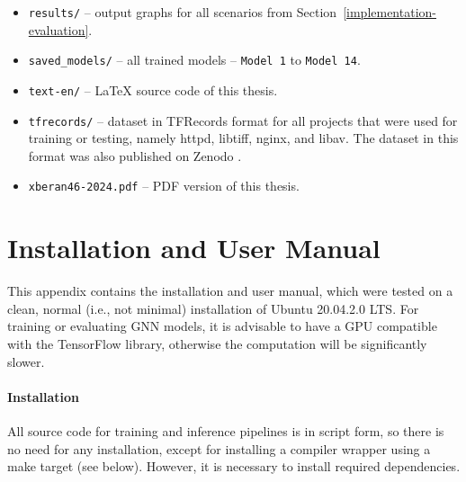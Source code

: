 \begin{itemize}
\begin{itemize}
\begin{itemize}
        \end{itemize}
        \item \texttt{sep-presentation-en/} -- \LaTeX\xspace source code of the SEP presentation.
        \item \texttt{sep-text-en/} -- \LaTeX\xspace source code of the SEP text.
        \item \texttt{text-en/} -- \LaTeX\xspace source code of this thesis.
        \item \texttt{text-template/} -- \LaTeX\xspace source code of the used template.
        \item \texttt{xberan46-2024.pdf} -- PDF version of this thesis.
        \item \texttt{.gitignore}
        \item \texttt{README.md}
    \end{itemize}

    \item \texttt{results/} -- output graphs for all scenarios from Section~\ref{implementation-evaluation}.
    \item \texttt{saved\_models/} -- all trained models -- \texttt{Model 1} to \texttt{Model 14}.
    \item \texttt{text-en/} -- \LaTeX\xspace source code of this thesis.
    \item \texttt{tfrecords/} -- dataset in TFRecords format for all projects that were used for training or testing, namely httpd, libtiff, nginx, and libav. The dataset in this format was also published on Zenodo \cite{zenodo-ecpg}.
    \item \texttt{xberan46-2024.pdf} -- PDF version of this thesis.
\end{itemize}



\chapter{Installation and User Manual}
\label{appendix-use-manual}
This appendix contains the installation and user manual, which were tested on a clean, normal (i.e., not minimal) installation of Ubuntu 20.04.2.0 LTS. For training or evaluating GNN models, it is advisable to have a GPU compatible with the TensorFlow library, otherwise the computation will be significantly slower.

\subsubsection{Installation}
All source code for training and inference pipelines is in script form, so there is no need for any installation, except for installing a compiler wrapper using a make target (see below). However, it is necessary to install required dependencies.

